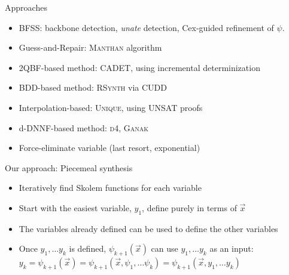 \documentclass[aspectratio=169]{beamer}
\begin{document}
\begin{frame}{Approaches}
\begin{itemize}
    \item BFSS: backbone detection, \emph{unate} detection,
        Cex-guided refinement of $\psi$.
    \item Guess-and-Repair: \textsc{Manthan} algorithm
    \item 2QBF-based method: \textsc{CADET}, using incremental determinization
    \item BDD-based method: \textsc{RSynth} via \textsc{CUDD}
    \item Interpolation-based: \textsc{Unique}, using UNSAT proofs
    \item d-DNNF-based method: \textsc{d4}, \textsc{Ganak}
    \item Force-eliminate variable (last resort, exponential)
\end{itemize}
\end{frame}

\begin{frame}{Our approach: Piecemeal synthesis}
\begin{itemize}
    \item Iteratively find Skolem functions for each variable
    \item Start with the easiest variable, $y_1$, define purely in terms of $\vec{x}$
    \item The variables already defined can be used to define the other variables
    \item Once $y_1, \ldots y_k$ is defined, $\psi_{k+1}(\vec{x})$ can use $y_1,\ldots y_k$ as an input:
        $y_k=\psi_{k+1}(\vec{x}) =
        \psi_{k+1}(\vec{x}, \psi_1, \ldots \psi_k) =
        \psi_{k+1}(\vec{x}, y_1, \ldots y_k)$
\end{itemize}
\bigskip

\end{frame}
\end{document}
